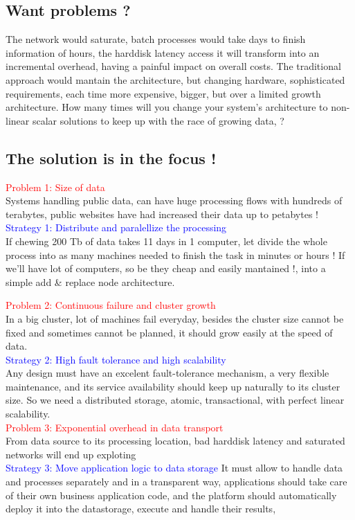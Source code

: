 \documentclass[12pt, right open]{memoir}
\begin{document}
\subsection{Want problems ?}
The network would saturate, batch processes would take days to finish information of hours, the harddisk latency access it will transform into an incremental overhead, having a painful impact on overall costs.
The traditional approach would mantain the architecture, but changing hardware, sophisticated requirements, each time more expensive, bigger, but over a limited growth architecture. How many times will you change your system's architecture to non-linear scalar solutions to keep up with the race of growing data, ?

\subsection{The solution is in the focus !}
\textcolor{red} {Problem 1: Size of data} \\
Systems handling public data, can have huge processing flows with hundreds of terabytes, public websites have had increased their data up to petabytes ! \\
\textcolor{blue} {Strategy 1: Distribute and paralellize the processing} \\
If chewing 200 Tb of data takes 11 days in 1 computer, let divide the whole process into as many machines needed to finish the task in minutes or hours !
If we'll have lot of computers, so be they cheap and easily mantained !, into a simple add \& replace node architecture.

\textcolor{red} {Problem 2: Continuous failure and cluster growth} \\
In a big cluster, lot of machines fail everyday, besides the cluster size cannot be fixed and sometimes cannot be planned, it should grow easily at the speed of data. \\
\textcolor{blue} {Strategy 2: High fault tolerance and high scalability} \\
Any design must have an excelent fault-tolerance mechanism, a very flexible maintenance, and its service availability should keep up naturally to its cluster size.
So we need a distributed storage, atomic, transactional, with perfect linear scalability. \\

\textcolor{red} {Problem 3: Exponential overhead in data transport} \\
From data source to its processing location, bad harddisk latency and saturated networks will end up exploting \\
\textcolor{blue} {Strategy 3: Move application logic to data storage}
It must allow to handle data and processes separately and in a transparent way, applications should take care of their own business application code, and the platform should automatically deploy it into the datastorage, execute and handle their results, 
\end{document}
